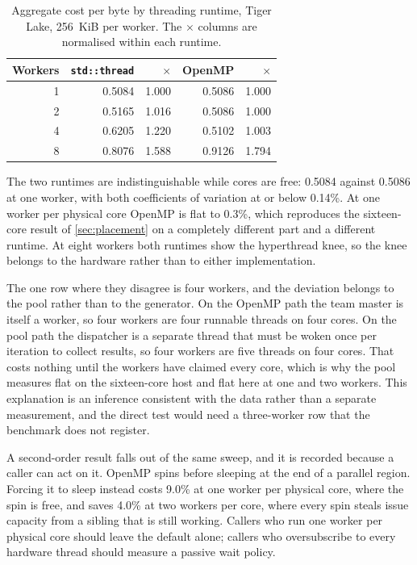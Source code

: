 \documentclass[acmsmall,screen,review]{acmart}
\theoremstyle{acmdefinition}
\newcommand{\code}[1]{\texttt{#1}}
\begin{document}
\begin{table}[t]
\centering
\caption{Aggregate cost per byte by threading runtime, Tiger Lake, 256~KiB per
worker. The $\times$ columns are normalised within each
runtime.}\label{tab:runtimes}
\footnotesize
\begin{tabular}{rrrrr}
\toprule
Workers & \code{std::thread} & $\times$ & OpenMP & $\times$ \\
\midrule
1 & 0.5084 & 1.000 & 0.5086 & 1.000 \\
2 & 0.5165 & 1.016 & 0.5086 & 1.000 \\
4 & 0.6205 & 1.220 & 0.5102 & 1.003 \\
8 & 0.8076 & 1.588 & 0.9126 & 1.794 \\
\bottomrule
\end{tabular}
\end{table}

The two runtimes are indistinguishable while cores are free: 0.5084 against
0.5086 at one worker, with both coefficients of variation at or below 0.14\%.
At one worker per physical core OpenMP is flat to 0.3\%, which reproduces the
sixteen-core result of \cref{sec:placement} on a completely different part and
a different runtime. At eight workers both runtimes show the hyperthread knee,
so the knee belongs to the hardware rather than to either implementation.

The one row where they disagree is four workers, and the deviation belongs to
the pool rather than to the generator. On the OpenMP path the team master is
itself a worker, so four workers are four runnable threads on four cores. On the
pool path the dispatcher is a separate thread that must be woken once per
iteration to collect results, so four workers are five threads on four cores.
That costs nothing until the workers have claimed every core, which is why the
pool measures flat on the sixteen-core host and flat here at one and two
workers. This explanation is an inference consistent with the data rather than a
separate measurement, and the direct test would need a three-worker row that the
benchmark does not register.

A second-order result falls out of the same sweep, and it is recorded because a
caller can act on it. OpenMP spins before sleeping at the end of a parallel
region.
Forcing it to sleep instead costs 9.0\% at one worker per physical core, where
the spin is free, and saves 4.0\% at two workers per core, where every spin
steals issue capacity from a sibling that is still working. Callers who run one
worker per physical core should leave the default alone; callers who
oversubscribe to every hardware thread should measure a passive wait policy.
\end{document}

